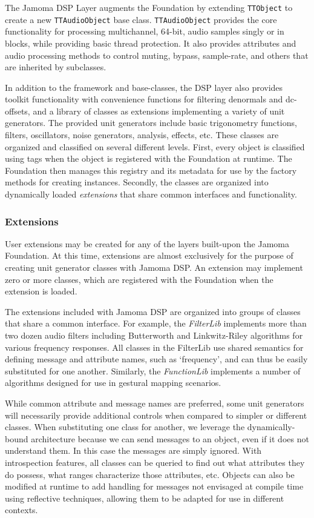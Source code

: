 \documentclass[twoside,10pt]{article}
\begin{document}
The Jamoma DSP Layer \cite{web9} augments the Foundation by extending \texttt{\small{TTObject}} to create a new \texttt{\small{TTAudioObject}} base class.  \texttt{\small{TTAudioObject}} provides the core functionality for processing multichannel, 64-bit, audio samples singly or in blocks, while providing basic thread protection.  It also provides attributes and audio processing methods to control muting, bypass, sample-rate, and others that are inherited by subclasses.

In addition to the framework and base-classes, the DSP layer also provides toolkit functionality with convenience functions for filtering denormals and dc-offsets, and a library of classes as extensions implementing a variety of unit generators.  The provided unit generators include basic trigonometry functions, filters, oscillators, noise generators, analysis, effects, etc.  These classes are organized and classified on several different levels.  First, every object is classified using tags when the object is registered with the Foundation at runtime.  The Foundation then manages this registry and its metadata for use by the factory methods for creating instances.  Secondly, the classes are organized into dynamically loaded \emph{extensions} that share common interfaces and functionality.

\subsubsection{Extensions}

User extensions may be created for any of the layers built-upon the Jamoma Foundation.  At this time, extensions are almost exclusively for the purpose of creating unit generator classes with Jamoma DSP. An extension may implement zero or more classes, which are registered with the Foundation when the extension is loaded.

The extensions included with Jamoma DSP are organized into groups of classes that share a common interface.  For example, the \emph{FilterLib} implements more than two dozen audio filters including Butterworth and Linkwitz-Riley algorithms for various frequency responses.  All classes in the FilterLib use shared semantics for defining message and attribute names, such as `frequency', and can thus be easily substituted for one another.  Similarly, the \emph{FunctionLib} implements a number of algorithms designed for use in gestural mapping scenarios.  

While common attribute and message names are preferred, some unit generators will necessarily provide additional controls when compared to simpler or different classes.  When substituting one class for another, we leverage the dynamically-bound architecture because we can send messages to an object, even if it does not understand them.  In this case the messages are simply ignored.  With introspection features, all classes can be queried to find out what attributes they do possess, what ranges characterize those attributes, etc.  Objects can also be modified at runtime to add handling for messages not envisaged at compile time using reflective techniques, allowing them to be adapted for use in different contexts.
\end{document}
